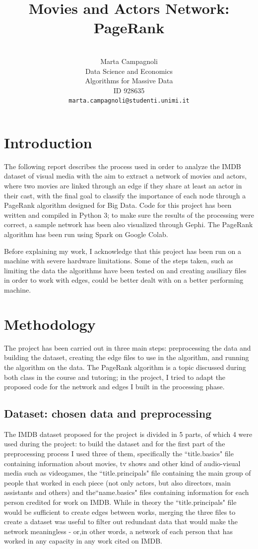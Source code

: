 \documentclass[11pt]{article}
\title{Movies and Actors Network: PageRank}
\author{\\Marta Campagnoli\\
  Data Science and Economics\\
  Algorithms for Massive Data\\
  ID 928635\\
  {\tt marta.campagnoli@studenti.unimi.it}}
\date{}
\begin{document}
\maketitle


\section{Introduction}

The following report describes the process used in order to analyze the IMDB dataset of visual media with the aim to extract a network of movies and actors, where two movies are linked through an edge if they share at least an actor in their cast, with the final goal to classify the importance of each node through a PageRank algorithm designed for Big Data. Code for this project has been written and compiled in Python 3; to make sure the results of the processing were correct, a sample network has been also visualized through Gephi. The PageRank algorithm has been run using Spark on Google Colab.

Before explaining my work, I acknowledge that this project has been run on a machine with severe hardware limitations. Some of the steps taken, such as limiting the data the algorithms have been tested on and creating ausiliary files in order to work with edges, could be better dealt with on a better performing machine.

\section{Methodology}

The project has been carried out in three main steps: preprocessing the data and building the dataset, creating the edge files to use in the algorithm, and running the algorithm on the data.
The PageRank algorithm is a topic discussed during both class in the course and tutoring; in the project, I tried to adapt the proposed code for the network and edges I built in the processing phase.

\subsection{Dataset: chosen data and preprocessing}

The IMDB dataset proposed for the project is divided in 5 parts, of which 4 were used during the project: to build the dataset and for the first part of the preprocessing process I used three of them, specifically the ``title.basics" file containing information about movies, tv shows and other kind of audio-visual media such as videogames, the ``title.principals" file containing the main group of people that worked in each piece (not only actors, but also directors, main assistants and others) and the``name.basics" files containing information for each person credited for work on IMDB. While in theory the ``title.principals" file would be sufficient to create edges between works, merging the three files to create a dataset was useful to filter out redundant data that would make the network meaningless - or,in other words, a network of each person that has worked in any capacity in any work cited on IMDB.\\
\end{document}
